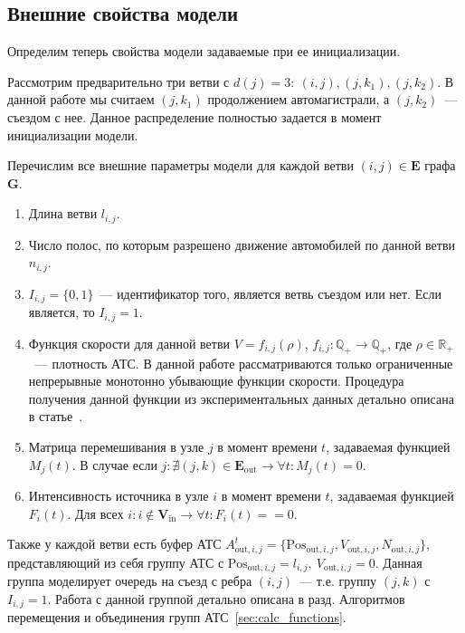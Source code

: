 \subsection{Внешние свойства модели}
\label{sec:graph_structure}
Определим теперь свойства модели задаваемые при ее инициализации.

Рассмотрим предварительно три ветви с $d(j) = 3:\ (i, j), (j, k_1), (j, k_2)$. В данной работе мы считаем $(j, k_1)$ продолжением автомагистрали, а $(j, k_2)$~--- съездом с нее. Данное распределение полностью задается в момент инициализации модели.

Перечислим все внешние параметры модели для каждой ветви $(i, j) \in \mathbf{E}$ графа $\mathbf{G}$.
\begin{enumerate}
    \item Длина ветви $l_{i, j}$.
    \item Число полос, по которым разрешено движение автомобилей по данной ветви $n_{i, j}$.
    \item $I_{i, j} = \{0, 1\}$~--- идентификатор того, является ветвь съездом или нет. Если является, то $I_{i, j} = 1$.
    \item Функция скорости для данной ветви $V = f_{i,j}(\rho)$, $f_{i,j}: \mathbb{Q}_+ \rightarrow \mathbb{Q}_+$, где $\rho\in\mathbb{R}_+$~--- плотность АТС.
        В данной работе рассматриваются только ограниченные непрерывные монотонно убывающие функции скорости.
        Процедура получения данной функции из экспериментальных данных детально описана в статье~\cite{collectiveArticle}.
    \item Матрица перемешивания в узле $j$ в момент времени $t$, задаваемая функцией $M_j(t)$.
        В случае если $j: \nexists (j,k) \in \mathbf{E}_\text{out} \rightarrow \forall t: M_j(t) = 0$.
    \item Интенсивность источника в узле $i$ в момент времени $t$, задаваемая функцией $F_i(t)$. Для всех $i: i\notin \mathbf{V}_\text{in} \rightarrow \forall t: F_i(t) == 0$.
\end{enumerate}

Также у каждой ветви есть буфер АТС $A^t_{\text{out}, i, j} = \{\mathrm{Pos}_{\text{out}, i, j}, V_{\text{out}, i, j}, N_{\text{out}, i, j}\}$, представляющий из себя группу АТС с $\mathrm{Pos}_{\text{out}, i, j} = l_{i, j},\ V_{\text{out}, i, j} = 0$. Данная группа моделирует очередь на съезд с ребра $(i, j)$~--- т.е. группу $(j, k)$ с $I_{i, j} = 1$. Работа с данной группой детально описана в разд. Алгоритмов перемещения и объединения групп АТС~\ref{sec:calc_functions}.


